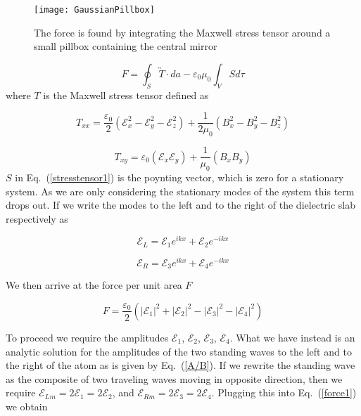 \documentclass[twocolumn,english,pra,aps,superscriptaddress,floatfix]{revtex4-1}
\begin{document}
\begin{figure}
\texttt{[image: GaussianPillbox]}
\caption{The force is found by integrating the Maxwell stress tensor around a small pillbox containing the central mirror}
\label{fig:gaussianpillbox}
\end{figure}

\begin{equation}
F=\oint_{S}\overleftrightarrow{T}\cdot da-\varepsilon_{0}\mu_{0}\int_{V}Sd\tau
\label{stresstensor1}
\end{equation}
where $T$ is the Maxwell stress tensor defined as

\begin{equation}
T_{xx}=\frac{\varepsilon_{0}}{2}\left(\mathcal{E}_{x}^{2}-\mathcal{E}_{y}^{2}-\mathcal{E}_{z}^{2}\right)+\frac{1}{2\mu_{0}}\left(B_{x}^{2}-B_{y}^{2}-B_{z}^{2}\right)
\label{stresstensor2}
\end{equation}


\begin{equation}
T_{xy}=\varepsilon_{0}\left(\mathcal{E}_{x}\mathcal{E}_{y}\right)+\frac{1}{\mu_{0}}\left(B_{x}B_{y}\right)
\label{stresstensor3}
\end{equation}
$S$ in Eq.\ (\ref{stresstensor1}) is the poynting vector, which is zero for a stationary system.  As we are only considering the stationary modes of the system this term drops out.
If we write the modes to the left and to the right of the dielectric
slab respectively as

\begin{equation}
\mathcal{E}_{L}=\mathcal{E}_{1}e^{ikx}+\mathcal{E}_{2}e^{-ikx}
\label{Efieldleft}
\end{equation}


\begin{equation}
\mathcal{E}_{R}=\mathcal{E}_{3}e^{ikx}+\mathcal{E}_{4}e^{-ikx}
\label{EfieldRight}
\end{equation}

We then arrive at the force per unit area $F$ 

\begin{equation}
F=\frac{\varepsilon_{0}}{2}\left(\left|\mathcal{E}_{1}\right|^{2}+\left|\mathcal{E}_{2}\right|^{2}-\left|\mathcal{E}_{3}\right|^{2}-\left|\mathcal{E}_{4}\right|^{2}\right)
\label{force1}
\end{equation}

To proceed we require the amplitudes $\mathcal{E}_{1}$, $\mathcal{E}_{2}$, $\mathcal{E}_{3}$, $\mathcal{E}_{4}$. What we have instead is an analytic solution for the amplitudes
of the two standing waves to the left and to the right of the atom as is given by Eq.\ (\ref{A/B}).
If we rewrite the standing wave as the composite of two traveling waves moving in opposite direction, then we require $\mathcal{E}_{Lm}=2\mathcal{E}_{1}=2\mathcal{E}_{2}$, and $\mathcal{E}_{Rm}=2\mathcal{E}_{3}=2\mathcal{E}_{4}$.
Plugging this into Eq.\ (\ref{force1}) we obtain
\end{document}
